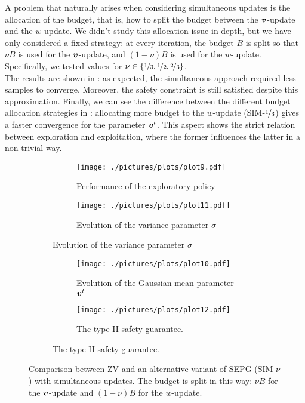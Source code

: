 A problem that naturally arises when considering simultaneous updates is the allocation of the budget, that is, how to split the budget between the $\boldsymbol{v}$-update and the $w$-update. We didn't study this allocation issue in-depth, but we have only considered a fixed-strategy: at every iteration, the budget $B$ is split so that $\nu B$ is used for the $\boldsymbol{v}$-update, and $(1-\nu)B$ is used for the $w$-update. Specifically, we tested values for $\nu \in \{\nicefrac{1}{3}, \nicefrac{1}{2}, \nicefrac{2}{3}\}$.\\
The results are shown in : as expected, the simultaneous approach required less samples to converge. Moreover, the safety constraint is still satisfied despite this approximation. Finally, we can see the difference between the different budget allocation strategies in : allocating more budget to the $w$-update (SIM-$\nicefrac{1}{3}$) gives a faster convergence for the parameter $\boldsymbol{v}^t$. This aspect shows the strict relation between exploration and exploitation, where the former influences the latter in a non-trivial way.



\begin{figure}[t]
\centering
\begin{subfigure}[t]{\textwidth}
\begin{subfigure}[t]{0.5\textwidth}
\texttt{[image: ./pictures/plots/plot9.pdf]}
\caption{Performance of the exploratory policy} \label{fig:plot3-1}
\end{subfigure}
\hfill
\begin{subfigure}[t]{0.5\textwidth}
\texttt{[image: ./pictures/plots/plot11.pdf]}
\caption{Evolution of the variance parameter $\sigma$} \label{fig:plot3-2}
\end{subfigure}
\end{subfigure}

\begin{subfigure}[t]{\textwidth}
\begin{subfigure}[t]{0.5\textwidth}
\texttt{[image: ./pictures/plots/plot10.pdf]}
\caption{Evolution of the Gaussian mean parameter $\boldsymbol{v}^t$} \label{fig:plot3-3}
\end{subfigure}
\hfill
\begin{subfigure}[t]{0.5\textwidth}
\texttt{[image: ./pictures/plots/plot12.pdf]}
\caption{The type-II safety guarantee. } \label{fig:plot3-4}
\end{subfigure}
\end{subfigure}

\caption[Comparison between ZV and SIM-$\nu$.]{Comparison between ZV and an alternative variant of SEPG (SIM-$\nu$) with simultaneous updates. The budget is split in this way: $\nu B$ for the $\boldsymbol{v}$-update and $(1-\nu)B$ for the $w$-update. }
\label{fig:plot3}
\end{figure}



